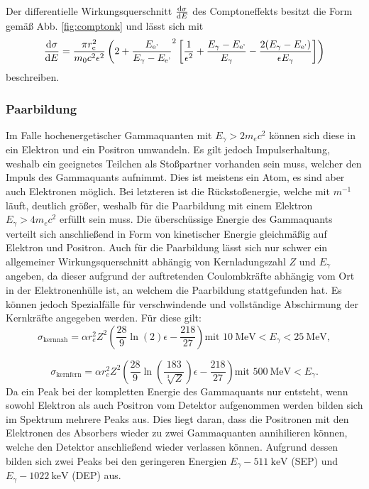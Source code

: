 Der differentielle Wirkungsquerschnitt $\frac{\mathop{}\!\mathrm{d} \sigma}{\mathop{}\!\mathrm{d} E}$ des Comptoneffekts besitzt die Form gemäß Abb. \ref{fig:comptonk} und lässt sich mit
\begin{equation}
    \frac{\mathop{}\!\mathrm{d} \sigma}{\mathop{}\!\mathrm{d} E} =  \frac{\pi r_\text{e}^2}{m_0 c^2 \epsilon^2}\left(2+\frac{E_\text{e'}}{E_\gamma - E_\text{e'}}^2 \left[ \frac{1}{\epsilon^2} +\frac{E_\gamma - E_\text{e'}}{E_\gamma} - \frac{2(E_\gamma - E_\text{e'})}{\epsilon E_\gamma} \right]\right) \label{eq:sigmacompdiff}
\end{equation}
beschreiben.

\subsubsection{Paarbildung}
Im Falle hochenergetischer Gammaquanten mit $E_\gamma > 2 m_e c^2$ können sich diese in ein Elektron und ein Positron umwandeln. Es gilt jedoch Impulserhaltung, weshalb ein geeignetes Teilchen als Stoßpartner vorhanden sein muss, welcher den Impuls des Gammaquants aufnimmt. Dies ist meistens ein Atom, es sind aber auch Elektronen möglich. Bei letzteren ist die Rückstoßenergie, welche mit $m^{-1}$ läuft, deutlich größer, weshalb für die Paarbildung mit einem Elektron $E_\gamma > 4 m_e c^2$ erfüllt sein muss. Die überschüssige Energie des Gammaquants verteilt sich anschließend in Form von kinetischer Energie gleichmäßig auf Elektron und Positron. Auch für die Paarbildung lässt sich nur schwer ein allgemeiner Wirkungsquerschnitt abhängig von Kernladungszahl $Z$ und $E_\gamma$ angeben, da dieser aufgrund der auftretenden Coulombkräfte abhängig vom Ort in der Elektronenhülle ist, an welchem die Paarbildung stattgefunden hat. Es können jedoch Spezialfälle für verschwindende und vollständige Abschirmung der Kernkräfte angegeben werden. Für diese gilt:
\begin{equation}
    \sigma_\text{kernnah} = \alpha r_e^2 Z^2 \left( \frac{28}{9}\ln(2) \epsilon - \frac{218}{27}\right) \text{mit } \SI{10}{\mega\electronvolt} < E_\gamma < \SI{25}{\mega\electronvolt} \label{eq:sigmapaar1},
\end{equation}

\begin{equation}
    \sigma_\text{kernfern} = \alpha r_e^2 Z^2 \left( \frac{28}{9}\ln\left(\frac{183}{\sqrt[3]{Z}}\right) \epsilon - \frac{218}{27}\right) \text{mit } \SI{500}{\mega\electronvolt} < E_\gamma \label{eq:sigmapaar2}.
\end{equation}
Da ein Peak bei der kompletten Energie des Gammaquants nur entsteht, wenn sowohl Elektron als auch Positron vom Detektor aufgenommen werden bilden sich im Spektrum mehrere Peaks aus. Dies liegt daran, dass die Positronen mit den Elektronen des Absorbers wieder zu zwei Gammaquanten annihilieren können, welche den Detektor anschließend wieder verlassen können. Aufgrund dessen bilden sich zwei Peaks bei den geringeren Energien $E_\gamma-\SI{511}{\kilo\electronvolt}$ (SEP) und $E_\gamma-\SI{1022}{\kilo\electronvolt}$ (DEP) aus.  

